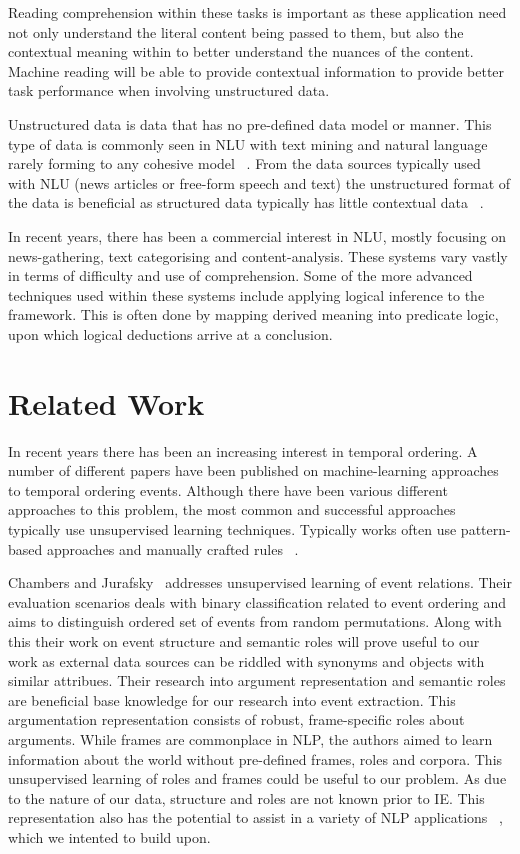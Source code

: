 \documentclass[bsc,frontabs,twoside,singlespacing,parskip,deptreport]{infthesis}     %
\begin{document}
Reading comprehension within these tasks is important as these application need not only understand the literal content
being passed to them, but also the contextual meaning within to better understand the nuances of the content.
Machine reading will be able to provide contextual information to provide better task performance when
involving unstructured data.

Unstructured data is data that has no pre-defined data model or manner. This type of data is
commonly seen in NLU with text mining and natural language rarely forming to any cohesive model ~\cite{feldman2007text}.
From the data sources typically used with NLU (news articles or free-form speech and text) the unstructured format of
the data is beneficial as structured data typically has little contextual data ~\cite{feldman2007text}.

In recent years, there has been a commercial interest in NLU, mostly focusing on news-gathering, text categorising and
content-analysis. These systems vary vastly in terms of difficulty and use of comprehension. Some of the more
advanced techniques used within these systems include applying logical inference to the framework. This is often done
by mapping derived meaning into predicate logic, upon which logical deductions arrive at a conclusion.


\section{Related Work}
In recent years there has been an increasing interest in temporal ordering.
A number of different papers have been published on machine-learning approaches to temporal ordering events.
Although there have been various different approaches to this problem, the most common and successful approaches typically
use unsupervised learning techniques. Typically works often use pattern-based approaches and manually crafted rules ~\cite{chklovski2004mining}.  

Chambers and Jurafsky~\cite{chambers2009unsupervised} addresses unsupervised learning of event relations. Their evaluation
scenarios deals with binary classification related to event ordering and aims to distinguish ordered set
of events from random permutations. Along with this their work on event structure and semantic roles will prove useful
to our work as external data sources can be riddled with synonyms and objects with similar attribues.
Their research into argument representation and semantic roles are beneficial base
knowledge for our research into event extraction.
This argumentation representation consists of robust,
frame-specific roles about arguments. While frames are commonplace in NLP, the authors aimed to learn information
about the world without pre-defined frames, roles and corpora. This unsupervised learning of roles and frames could
be useful to our problem. As due to the nature of our data, structure and roles are not known prior to
IE. This representation also has the potential to assist in a variety of NLP applications ~\cite{chambers2009unsupervised}, which
we intented to build upon.
\end{document}
